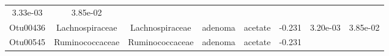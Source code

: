 \documentclass[11pt,]{article}
\begin{document}
\begin{longtable}[]{@{}cccccccc@{}}
\begin{minipage}[t]{0.08\columnwidth}
3.33e-03\strut
\end{minipage} & \begin{minipage}[t]{0.08\columnwidth}\centering\strut
3.85e-02\strut
\end{minipage}\tabularnewline
\begin{minipage}[t]{0.08\columnwidth}\centering\strut
Otu00436\strut
\end{minipage} & \begin{minipage}[t]{0.15\columnwidth}\centering\strut
Lachnospiraceae\strut
\end{minipage} & \begin{minipage}[t]{0.15\columnwidth}\centering\strut
Lachnospiraceae\strut
\end{minipage} & \begin{minipage}[t]{0.08\columnwidth}\centering\strut
adenoma\strut
\end{minipage} & \begin{minipage}[t]{0.09\columnwidth}\centering\strut
acetate\strut
\end{minipage} & \begin{minipage}[t]{0.07\columnwidth}\centering\strut
-0.231\strut
\end{minipage} & \begin{minipage}[t]{0.08\columnwidth}\centering\strut
3.20e-03\strut
\end{minipage} & \begin{minipage}[t]{0.08\columnwidth}\centering\strut
3.85e-02\strut
\end{minipage}\tabularnewline
\begin{minipage}[t]{0.08\columnwidth}\centering\strut
Otu00545\strut
\end{minipage} & \begin{minipage}[t]{0.15\columnwidth}\centering\strut
Ruminococcaceae\strut
\end{minipage} & \begin{minipage}[t]{0.15\columnwidth}\centering\strut
Ruminococcaceae\strut
\end{minipage} & \begin{minipage}[t]{0.08\columnwidth}\centering\strut
adenoma\strut
\end{minipage} & \begin{minipage}[t]{0.09\columnwidth}\centering\strut
acetate\strut
\end{minipage} & \begin{minipage}[t]{0.07\columnwidth}\centering\strut
-0.231\strut
\end{minipage} & \begin{minipage}[t]{0.08\columnwidth}\centering\strut

\end{minipage}
\end{longtable}
\end{document}
